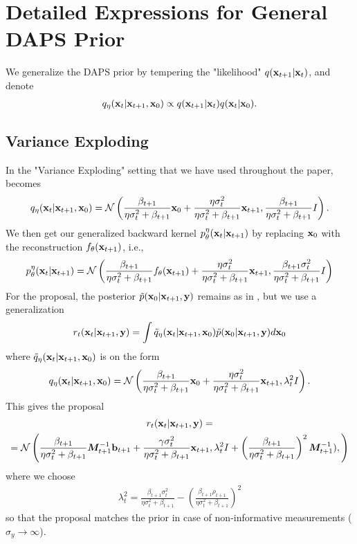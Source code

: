 \section{Detailed Expressions for General DAPS Prior}
\label{app:general_DAPS_prior}
We generalize the DAPS prior by tempering the "likelihood" $q(\mathbf{x}_{t+1}|\mathbf{x}_{t})$, and denote 
\begin{align}
    q_\eta(\mathbf{x}_{t}|\mathbf{x}_{t+1}, \mathbf{x}_0) \propto q(\mathbf{x}_{t+1}|\mathbf{x}_{t})q(\mathbf{x}_{t}|\mathbf{x}_0). \label{eq:q_eta_general_app}
\end{align}

\subsection{Variance Exploding}
In the "Variance Exploding" setting that we have used throughout the paper,  becomes
\begin{align}
    q_\eta(\mathbf{x}_{t}|\mathbf{x}_{t+1}, \mathbf{x}_0) = \mathcal{N}\left(\frac{\beta_{t+1}}{\eta\sigma_t^2 + \beta_{t+1}}\mathbf{x}_0 + \frac{\eta\sigma_t^2}{\eta\sigma_t^2 + \beta_{t+1}}\mathbf{x}_{t+1}, \frac{\beta_{t+1}}{\eta\sigma_t^2 + \beta_{t+1}}I\right).
\end{align}
We then get our generalized backward kernel $p_\theta^{\eta}(\mathbf{x}_{t}|\mathbf{x}_{t+1})$ by replacing $\mathbf{x}_0$ with the reconstruction $f_\theta(\mathbf{x}_{t+1})$, i.e.,
\begin{align}
    p_\theta^\eta(\mathbf{x}_{t}|\mathbf{x}_{t+1}) =\mathcal{N}\left(\frac{\beta_{t+1}}{\eta\sigma_t^2 + \beta_{t+1}}f_\theta(\mathbf{x}_{t+1})
    +
    \frac{\eta\sigma_t^2}{\eta\sigma_t^2 + \beta_{t+1}}\mathbf{x}_{t+1}, \frac{\beta_{t+1}\sigma_t^2}{\eta\sigma_t^2 + \beta_{t+1}}I\right)
\end{align}
For the proposal, the posterior $\tilde p(\mathbf{x}_0|\mathbf{x}_{t+1}, \mathbf{y})$ remains as in , but we use a generalization 
\begin{align}
    r_t(\mathbf{x}_{t}|\mathbf{x}_{t+1}, \mathbf{y}) = \int \tilde q_\eta(\mathbf{x}_{t}|\mathbf{x}_{t+1}, \mathbf{x}_0)\tilde p(\mathbf{x}_0|\mathbf{x}_{t+1}, \mathbf{y})d\mathbf{x}_0
\end{align}
where $\tilde q_\eta(\mathbf{x}_{t}|\mathbf{x}_{t+1}, \mathbf{x}_0)$ is on the form
\begin{align}
    q_\eta(\mathbf{x}_{t}|\mathbf{x}_{t+1}, \mathbf{x}_0) = \mathcal{N}\left(\frac{\beta_{t+1}}{\eta\sigma_t^2 + \beta_{t+1}}\mathbf{x}_0 + \frac{\eta\sigma_t^2}{\eta\sigma_t^2 + \beta_{t+1}}\mathbf{x}_{t+1}, \lambda_t^2I\right).
\end{align}
This gives the proposal
\begin{gather}
    r_t(\mathbf{x}_{t}|\mathbf{x}_{t+1}, \mathbf{y}) = \nonumber \\
    =\mathcal{N}\left(
    \frac{\beta_{t+1}}{\eta\sigma_t^2 + \beta_{t+1}} {\bm{M}}_{t+1}^{-1}{\mathbf{b}}_{t+1} + \frac{\gamma\sigma_t^2}{\eta\sigma_t^2 + \beta_{t+1}}\mathbf{x}_{t+1}, \lambda_t^2 I + \left(\frac{\beta_{t+1}}{\eta\sigma_t^2 + \beta_{t+1}}\right)^2 {\bm{M}}_{t+1}^{-1}), \label{eq:general_eta_proposal}
    \right)
\end{gather}
where we choose
\begin{align}
    \lambda_t^2 = \frac{\beta_{t+1}\sigma_t^2}{\eta\sigma_t^2 + \beta_{t+1}} - \left(\frac{\beta_{t+1}\rho_{t+1}}{\eta\sigma_t^2 + \beta_{t+1}}\right)^2 
\end{align}
so that the proposal matches the prior in case of non-informative measurements ($\sigma_y \rightarrow \infty$).


